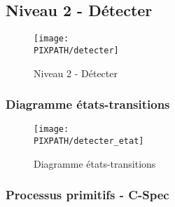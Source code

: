 \subsection{Niveau 2 - Détecter}

\begin{center}
\begin{figure}[!h]
\texttt{[image: \\PIXPATH/detecter]}
\caption{Niveau 2 - Détecter}
\end{figure}
\end{center}


\subsubsection{Diagramme états-transitions}

\begin{center}
\begin{figure}[!h]
\texttt{[image: \\PIXPATH/detecter\_etat]}
\caption{Diagramme états-transitions}
\end{figure}
\end{center}

\vfill
\pagebreak

\subsubsection{Processus primitifs - C-Spec}

